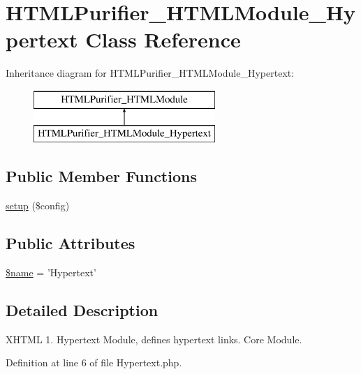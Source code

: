 \hypertarget{classHTMLPurifier__HTMLModule__Hypertext}{\section{H\+T\+M\+L\+Purifier\+\_\+\+H\+T\+M\+L\+Module\+\_\+\+Hypertext Class Reference}
\label{classHTMLPurifier__HTMLModule__Hypertext}
}
Inheritance diagram for H\+T\+M\+L\+Purifier\+\_\+\+H\+T\+M\+L\+Module\+\_\+\+Hypertext\+:\begin{figure}[H]
\begin{center}
\leavevmode
\includegraphics[height=2.000000cm]{classHTMLPurifier__HTMLModule__Hypertext}
\end{center}
\end{figure}
\subsection*{Public Member Functions}
\begin{DoxyCompactItemize}
\item 
\hyperlink{classHTMLPurifier__HTMLModule__Hypertext_ad43efeeb4043867beb5fb0b78d1ab472}{setup} (\$config)
\end{DoxyCompactItemize}
\subsection*{Public Attributes}
\begin{DoxyCompactItemize}
\item 
\hyperlink{classHTMLPurifier__HTMLModule__Hypertext_a7adb2367f5650f1d435d964e0049c318}{\$name} = 'Hypertext'
\end{DoxyCompactItemize}


\subsection{Detailed Description}
X\+H\+T\+M\+L 1. Hypertext Module, defines hypertext links. Core Module. 

Definition at line 6 of file Hypertext.\+php.



